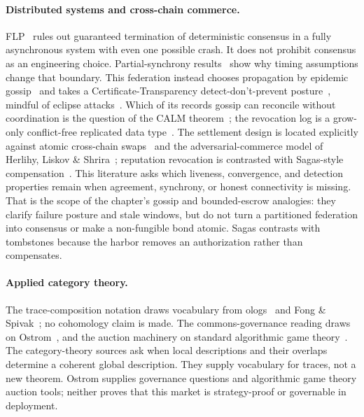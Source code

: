 \documentclass[11pt,a4paper]{article}
\theoremstyle{definition}
\theoremstyle{definition}
\theoremstyle{remark}
\begin{document}
\paragraph{Distributed systems and cross-chain commerce.} FLP~
rules out guaranteed termination of deterministic consensus in a fully
asynchronous system with even one possible crash. It does not prohibit
consensus as an engineering choice. Partial-synchrony results~
show why timing assumptions change that boundary. This federation instead
chooses propagation by epidemic gossip~ and takes
a Certificate-Transparency detect-don't-prevent posture~,
mindful of eclipse attacks~. Which of its records gossip
can reconcile without coordination is the question of the CALM
theorem~; the revocation
log is a grow-only conflict-free replicated data type~. The settlement design is located
explicitly against atomic cross-chain swaps~ and the
adversarial-commerce model of Herlihy, Liskov \& Shrira~; reputation
revocation is contrasted with Sagas-style compensation~.
This literature asks which liveness, convergence, and detection properties
remain when agreement, synchrony, or honest connectivity is missing. That is
the scope of the chapter's gossip and bounded-escrow analogies: they clarify
failure posture and stale windows, but do not turn a partitioned federation
into consensus or make a non-fungible bond atomic. Sagas contrasts with
tombstones because the harbor removes an authorization rather than compensates.

\paragraph{Applied category theory.} The trace-composition notation draws
vocabulary from ologs~ and Fong \&
Spivak~; no cohomology claim is made. The commons-governance reading draws on
Ostrom~, and the auction machinery on standard algorithmic game
theory~.
The category-theory sources ask when local descriptions and their overlaps
determine a coherent global description. They supply vocabulary for traces,
not a new theorem. Ostrom supplies governance questions and algorithmic
game theory auction tools; neither proves that this market is strategy-proof or
governable in deployment.
\end{document}
